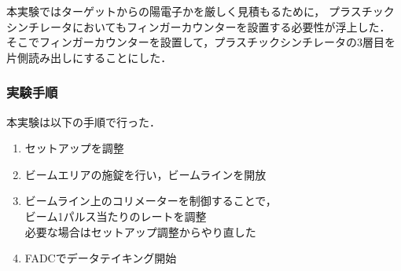 本実験ではターゲットからの陽電子かを厳しく見積もるために，
プラスチックシンチレータにおいてもフィンガーカウンターを設置する必要性が浮上した．
そこでフィンガーカウンターを設置して，プラスチックシンチレータの3層目を片側読み出しにすることにした．

\subsubsection{実験手順}
本実験は以下の手順で行った．
\begin{enumerate}
  \item セットアップを調整
  \item ビームエリアの施錠を行い，ビームラインを開放
  \item ビームライン上のコリメーターを制御することで， \\ビーム1パルス当たりのレートを調整
    \\必要な場合はセットアップ調整からやり直した
  \item FADCでデータテイキング開始
\end{enumerate}
%
